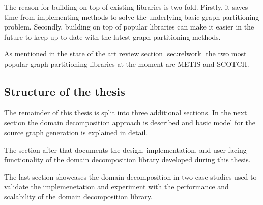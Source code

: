 The reason for building on top of existing libraries is two-fold.
Firstly, it saves time from implementing methods to solve the underlying basic graph partitioning problem.
Secondly, building on top of popular libraries can make it easier in the future to keep up to date with the latest graph partitioning methods.

As mentioned in the state of the art review section \ref{sec:relwork} the two most popular graph partitioning libraries at the moment are METIS and SCOTCH.

\subsection{Structure of the thesis}
The remainder of this thesis is split into three additional sections.
In the next section the domain decomposition approach is described and basic model for the source graph generation is explained in detail.

The section after that documents the design, implementation, and user facing functionality of the domain decomposition library developed during this thesis.

The last section showcases the domain decomposition in two case studies used to validate the implemenetation and experiment with the performance and scalability of the domain decomposition library.
